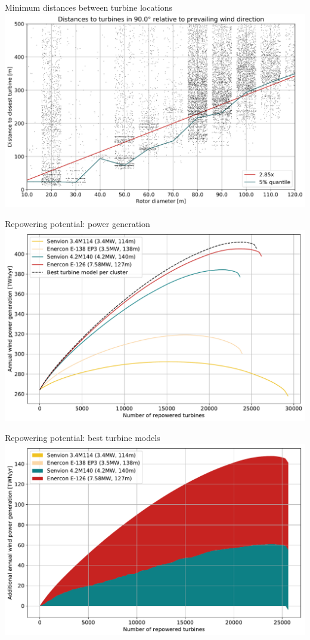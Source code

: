 \documentclass[color=usenames,dvipsnames]{beamer}
\begin{document}
    \begin{frame}{Minimum distances between turbine locations}
        \includegraphics[width=\textwidth]{../../figures/distances_between_turbines.png}
    \end{frame}

    \begin{frame}{Repowering potential: power generation}
        \includegraphics[width=\textwidth]{../../figures/repower_potential-direction-dependent_power_generation.pdf}
    \end{frame}

    \begin{frame}{Repowering potential: best turbine models}
        \includegraphics[width=\textwidth]{../../figures/repower_potential-direction-dependent_power_generation-stacked.pdf}
    \end{frame}
\end{document}
